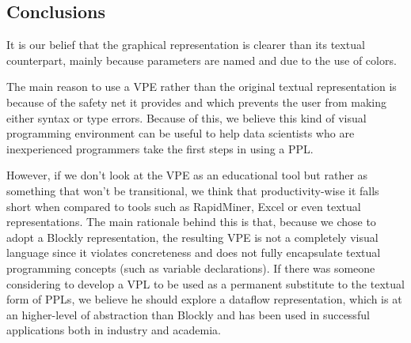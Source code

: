 \documentclass[9pt,a4paper]{extarticle}
\begin{document}
\begin{multicols}{2}
\section{Conclusions}\label{sec:conclui}

It is our belief that the graphical representation is clearer than its textual counterpart, mainly
because parameters are named and due to the use of colors.

The main reason to use a VPE rather than the original textual representation is because of the
safety net it provides and which prevents the user from making either syntax or type errors.
Because of this, we believe this kind of visual programming environment can be useful to
help data scientists who are inexperienced programmers take the first steps in using a PPL.

However, if we don’t look at the VPE as an educational tool but rather as something that
won’t be transitional, we think that productivity-wise it falls short when compared to tools such as
RapidMiner, Excel or even textual representations. The main rationale behind this is that, because
we chose to adopt a Blockly representation, the resulting VPE is not a completely visual language
since it violates concreteness and does not fully encapsulate textual programming concepts (such
as variable declarations). If there was someone considering to develop a VPL to be used as a
permanent substitute to the textual form of PPLs, we believe he should explore a dataflow representation,
which is at an higher-level of abstraction than Blockly and has been used in successful
applications both in industry and academia.



\end{multicols}
\end{document}
